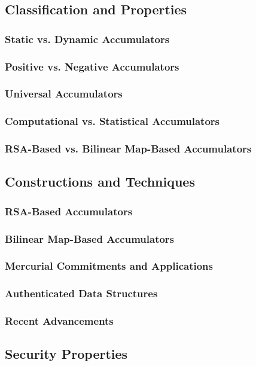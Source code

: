 \documentclass{iacrcc}
\begin{document}
\cite{CCS:CFHKKO22,CCS:CGGN17,CCS:CamFioQue19,AC:CFGKN20,CCS:MMKMR17}

\subsection{Classification and Properties}
\subsubsection{Static vs. Dynamic Accumulators}
\subsubsection{Positive vs. Negative Accumulators}
\subsubsection{Universal Accumulators}
\subsubsection{Computational vs. Statistical Accumulators}
\subsubsection{RSA-Based vs. Bilinear Map-Based Accumulators}
\subsection{Constructions and Techniques}
\subsubsection{RSA-Based Accumulators}
\subsubsection{Bilinear Map-Based Accumulators}
\subsubsection{Mercurial Commitments and Applications}
\subsubsection{Authenticated Data Structures}
\subsubsection{Recent Advancements}
\subsection{Security Properties}
\end{document}
